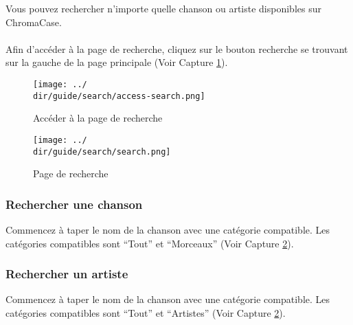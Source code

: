 Vous pouvez rechercher n'importe quelle chanson ou artiste disponibles sur ChromaCase.
\\\\
Afin d’accéder à la page de recherche, cliquez sur le bouton recherche se trouvant sur la gauche de la page principale (Voir Capture \ref{fig:access-search}).

\begin{figure}[H]
	\texttt{[image: ../\\dir/guide/search/access-search.png]}
	\caption{Accéder à la page de recherche}
	\label{fig:access-search}
\end{figure}
\begin{figure}[H]
	\texttt{[image: ../\\dir/guide/search/search.png]}
	\caption{Page de recherche}
	\label{fig:search}
\end{figure}

\subsubsection{Rechercher une chanson}
Commencez à taper le nom de la chanson avec une catégorie compatible. Les catégories compatibles sont “Tout” et “Morceaux” (Voir Capture \ref{fig:search}).

\subsubsection{Rechercher un artiste}
Commencez à taper le nom de la chanson avec une catégorie compatible. Les catégories compatibles sont “Tout” et “Artistes” (Voir Capture \ref{fig:search}).